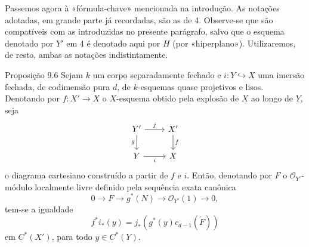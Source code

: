 Passemos agora à «fórmula-chave» mencionada na introdução. As notações adotadas, em grande parte já recordadas, são as de 4. Observe-se que são compatíveis com as introduzidas no presente parágrafo, salvo que o esquema denotado por $Y'$ em 4 é denotado aqui por $H$ (por «hiperplano»). Utilizaremos, de resto, ambas as notações indistintamente.

\begin{statement}{Proposição 9.6}
Sejam $k$ um corpo separadamente fechado e $i:Y\hookrightarrow X$ uma imersão fechada, de codimensão pura $d$, de $k$-esquemas quase projetivos e lisos. Denotando por $f:X'\to X$ o $X$-esquema obtido pela explosão de $X$ ao longo de $Y$, seja
\[
\begin{tikzcd}
Y'\arrow[r,"j"]\arrow[d,"g"']&X'\arrow[d,"f"]\\
Y\arrow[r,"i"']&X
\end{tikzcd}
\]
o diagrama cartesiano construído a partir de $f$ e $i$. Então, denotando por $F$ o $\mathcal O_{Y'}$-módulo localmente livre definido pela sequência exata canônica
\[
0\to F\to g^*(N)\to\mathcal O_{Y'}(1)\to0,
\tag{9.6.1}
\]
tem-se a igualdade
\[
f^*i_*(y)=j_*(g^*(y)c_{d-1}(\check F))
\tag{9.6.2}
\]
em $C^*(X')$, para todo $y\in C^*(Y)$.
\end{statement}
